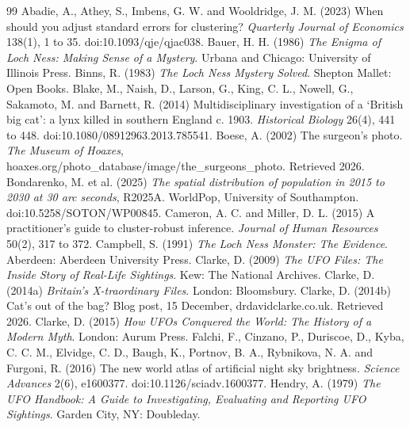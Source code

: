 \documentclass[11pt,a4paper]{article}
\begin{document}
\begin{thebibliography}{99}
 Abadie, A., Athey, S., Imbens, G. W. and Wooldridge, J. M. (2023) When should you adjust standard errors for clustering? \textit{Quarterly Journal of Economics} 138(1), 1 to 35. doi:10.1093/qje/qjac038.
 Bauer, H. H. (1986) \textit{The Enigma of Loch Ness: Making Sense of a Mystery}. Urbana and Chicago: University of Illinois Press.
 Binns, R. (1983) \textit{The Loch Ness Mystery Solved}. Shepton Mallet: Open Books.
 Blake, M., Naish, D., Larson, G., King, C. L., Nowell, G., Sakamoto, M. and Barnett, R. (2014) Multidisciplinary investigation of a `British big cat': a lynx killed in southern England c. 1903. \textit{Historical Biology} 26(4), 441 to 448. doi:10.1080/08912963.2013.785541.
 Boese, A. (2002) The surgeon's photo. \textit{The Museum of Hoaxes}, hoaxes.org/photo\_database/image/the\_surgeons\_photo. Retrieved 2026.
 Bondarenko, M. et al. (2025) \textit{The spatial distribution of population in 2015 to 2030 at 30 arc seconds}, R2025A. WorldPop, University of Southampton. doi:10.5258/SOTON/WP00845.
 Cameron, A. C. and Miller, D. L. (2015) A practitioner's guide to cluster-robust inference. \textit{Journal of Human Resources} 50(2), 317 to 372.
 Campbell, S. (1991) \textit{The Loch Ness Monster: The Evidence}. Aberdeen: Aberdeen University Press.
 Clarke, D. (2009) \textit{The UFO Files: The Inside Story of Real-Life Sightings}. Kew: The National Archives.
 Clarke, D. (2014a) \textit{Britain's X-traordinary Files}. London: Bloomsbury.
 Clarke, D. (2014b) Cat's out of the bag? Blog post, 15 December, drdavidclarke.co.uk. Retrieved 2026.
 Clarke, D. (2015) \textit{How UFOs Conquered the World: The History of a Modern Myth}. London: Aurum Press.
 Falchi, F., Cinzano, P., Duriscoe, D., Kyba, C. C. M., Elvidge, C. D., Baugh, K., Portnov, B. A., Rybnikova, N. A. and Furgoni, R. (2016) The new world atlas of artificial night sky brightness. \textit{Science Advances} 2(6), e1600377. doi:10.1126/sciadv.1600377.
 Hendry, A. (1979) \textit{The UFO Handbook: A Guide to Investigating, Evaluating and Reporting UFO Sightings}. Garden City, NY: Doubleday.

\end{thebibliography}
\end{document}
